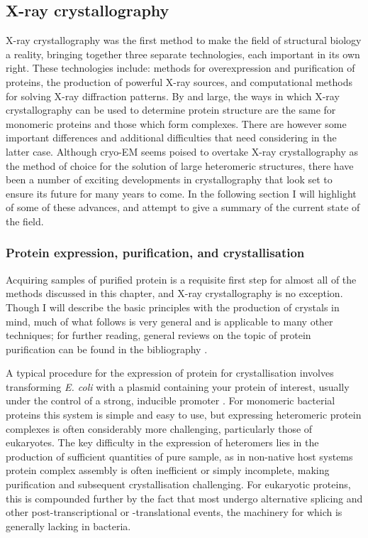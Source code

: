\documentclass[a4paper,11pt,twoside,openright]{scrbook}
\begin{document}
\subsection{X-ray crystallography}
X-ray crystallography was the first method to make the field of structural
biology a reality, bringing together three separate technologies, each important
in its own right. These technologies include: methods for overexpression and
purification of proteins, the production of powerful X-ray sources, and
computational methods for solving X-ray diffraction patterns. By and large, the
ways in which X-ray crystallography can be used to determine protein structure
are the same for monomeric proteins and those which form complexes. There are
however some important differences and additional difficulties that need
considering in the latter case. Although cryo-EM seems poised to overtake X-ray
crystallography as the method of choice for the solution of large heteromeric
structures, there have been a number of exciting developments in crystallography
that look set to ensure its future for many years to come. In the following
section I will highlight of some of these advances, and attempt to give a
summary of the current state of the field.

\subsubsection{Protein expression, purification, and crystallisation}
Acquiring samples of purified protein is a requisite first step for almost all
of the methods discussed in this chapter, and X-ray crystallography is no
exception. Though I will describe the basic principles with the production of
crystals in mind, much of what follows is very general and is applicable to many
other techniques; for further reading, general reviews on the topic of protein
purification can be found in the bibliography
\cite{Link2005,Graslund2008,LaCava2016}.

A typical procedure for the expression of protein for crystallisation involves
transforming \textit{E. coli} with a plasmid containing your protein of
interest, usually under the control of a strong, inducible promoter
\cite{Rosano2014}. For monomeric bacterial proteins this system is simple and
easy to use, but expressing heteromeric protein complexes is often considerably
more challenging, particularly those of eukaryotes. The key difficulty in the
expression of heteromers lies in the production of sufficient quantities of pure
sample, as in non-native host systems protein complex assembly is often
inefficient or simply incomplete, making purification and subsequent
crystallisation challenging. For eukaryotic proteins, this is compounded further
by the fact that most undergo alternative splicing and other
post-transcriptional or -translational events, the machinery for which is
generally lacking in bacteria.
\end{document}
